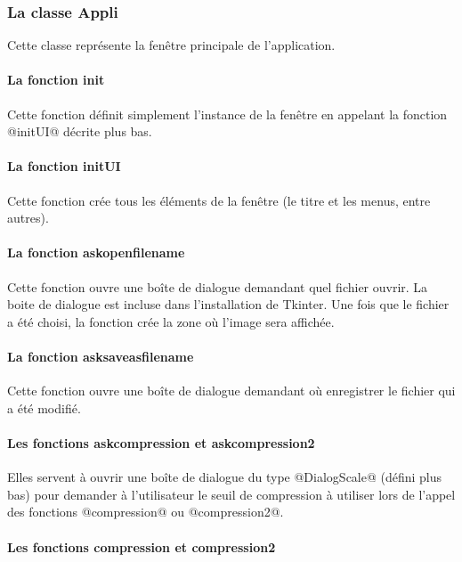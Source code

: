 \documentclass{article}
\begin{document}
\subsubsection{La classe Appli}

Cette classe représente la fenêtre principale de l'application.

\paragraph{La fonction init}

Cette fonction définit simplement l'instance de la fenêtre en appelant la fonction @initUI@ décrite plus bas.

\paragraph{La fonction initUI}

Cette fonction crée tous les éléments de la fenêtre (le titre et les menus, entre autres).

\paragraph{La fonction askopenfilename}

Cette fonction ouvre une boîte de dialogue demandant quel fichier ouvrir. La boite de dialogue est incluse dans l'installation de Tkinter.
Une fois que le fichier a été choisi, la fonction crée la zone où l'image sera affichée.

\paragraph{La fonction asksaveasfilename}

Cette fonction ouvre une boîte de dialogue demandant où enregistrer le fichier qui a été modifié.

\paragraph{Les fonctions askcompression et askcompression2}

Elles servent à ouvrir une boîte de dialogue du type @DialogScale@ (défini plus bas) pour demander à l'utilisateur le seuil de compression à utiliser lors de l'appel des fonctions @compression@ ou @compression2@.

\paragraph{Les fonctions compression et compression2}
\end{document}
